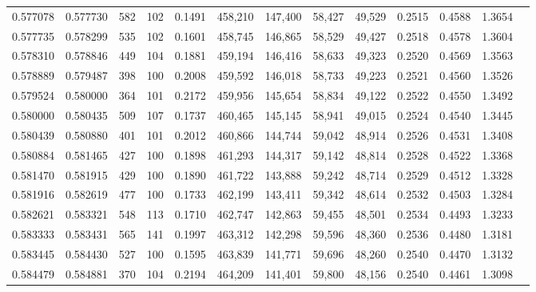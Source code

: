 \begin{tabular}{rrrrrrrrrrrrr}
0.577078 & 0.577730 &    582 &   102 &                                     0.1491 & 458,210 & 147,400 &  58,427 &  49,529 & 0.2515 & 0.4588 & 1.3654 \\
0.577735 & 0.578299 &    535 &   102 &                                     0.1601 & 458,745 & 146,865 &  58,529 &  49,427 & 0.2518 & 0.4578 & 1.3604 \\
0.578310 & 0.578846 &    449 &   104 &                                     0.1881 & 459,194 & 146,416 &  58,633 &  49,323 & 0.2520 & 0.4569 & 1.3563 \\
0.578889 & 0.579487 &    398 &   100 &                                     0.2008 & 459,592 & 146,018 &  58,733 &  49,223 & 0.2521 & 0.4560 & 1.3526 \\
0.579524 & 0.580000 &    364 &   101 &                                     0.2172 & 459,956 & 145,654 &  58,834 &  49,122 & 0.2522 & 0.4550 & 1.3492 \\
0.580000 & 0.580435 &    509 &   107 &                                     0.1737 & 460,465 & 145,145 &  58,941 &  49,015 & 0.2524 & 0.4540 & 1.3445 \\
0.580439 & 0.580880 &    401 &   101 &                                     0.2012 & 460,866 & 144,744 &  59,042 &  48,914 & 0.2526 & 0.4531 & 1.3408 \\
0.580884 & 0.581465 &    427 &   100 &                                     0.1898 & 461,293 & 144,317 &  59,142 &  48,814 & 0.2528 & 0.4522 & 1.3368 \\
0.581470 & 0.581915 &    429 &   100 &                                     0.1890 & 461,722 & 143,888 &  59,242 &  48,714 & 0.2529 & 0.4512 & 1.3328 \\
0.581916 & 0.582619 &    477 &   100 &                                     0.1733 & 462,199 & 143,411 &  59,342 &  48,614 & 0.2532 & 0.4503 & 1.3284 \\
0.582621 & 0.583321 &    548 &   113 &                                     0.1710 & 462,747 & 142,863 &  59,455 &  48,501 & 0.2534 & 0.4493 & 1.3233 \\
0.583333 & 0.583431 &    565 &   141 &                                     0.1997 & 463,312 & 142,298 &  59,596 &  48,360 & 0.2536 & 0.4480 & 1.3181 \\
0.583445 & 0.584430 &    527 &   100 &                                     0.1595 & 463,839 & 141,771 &  59,696 &  48,260 & 0.2540 & 0.4470 & 1.3132 \\
0.584479 & 0.584881 &    370 &   104 &                                     0.2194 & 464,209 & 141,401 &  59,800 &  48,156 & 0.2540 & 0.4461 & 1.3098 \\

\end{tabular}
